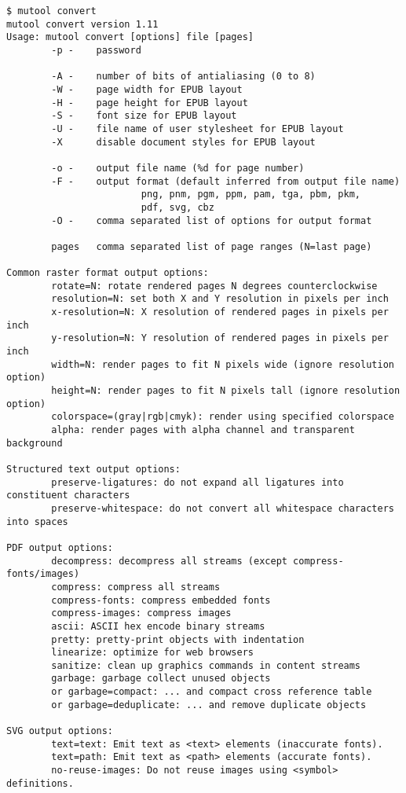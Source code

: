 \documentclass[oneside]{book}
\begin{document}
\begin{lstlisting}
$ mutool convert
mutool convert version 1.11
Usage: mutool convert [options] file [pages]
        -p -    password

        -A -    number of bits of antialiasing (0 to 8)
        -W -    page width for EPUB layout
        -H -    page height for EPUB layout
        -S -    font size for EPUB layout
        -U -    file name of user stylesheet for EPUB layout
        -X      disable document styles for EPUB layout

        -o -    output file name (%d for page number)
        -F -    output format (default inferred from output file name)
                        png, pnm, pgm, ppm, pam, tga, pbm, pkm,
                        pdf, svg, cbz
        -O -    comma separated list of options for output format

        pages   comma separated list of page ranges (N=last page)

Common raster format output options:
        rotate=N: rotate rendered pages N degrees counterclockwise
        resolution=N: set both X and Y resolution in pixels per inch
        x-resolution=N: X resolution of rendered pages in pixels per inch
        y-resolution=N: Y resolution of rendered pages in pixels per inch
        width=N: render pages to fit N pixels wide (ignore resolution option)
        height=N: render pages to fit N pixels tall (ignore resolution option)
        colorspace=(gray|rgb|cmyk): render using specified colorspace
        alpha: render pages with alpha channel and transparent background

Structured text output options:
        preserve-ligatures: do not expand all ligatures into constituent characters
        preserve-whitespace: do not convert all whitespace characters into spaces

PDF output options:
        decompress: decompress all streams (except compress-fonts/images)
        compress: compress all streams
        compress-fonts: compress embedded fonts
        compress-images: compress images
        ascii: ASCII hex encode binary streams
        pretty: pretty-print objects with indentation
        linearize: optimize for web browsers
        sanitize: clean up graphics commands in content streams
        garbage: garbage collect unused objects
        or garbage=compact: ... and compact cross reference table
        or garbage=deduplicate: ... and remove duplicate objects

SVG output options:
        text=text: Emit text as <text> elements (inaccurate fonts).
        text=path: Emit text as <path> elements (accurate fonts).
        no-reuse-images: Do not reuse images using <symbol> definitions.
\end{lstlisting}
\end{document}
